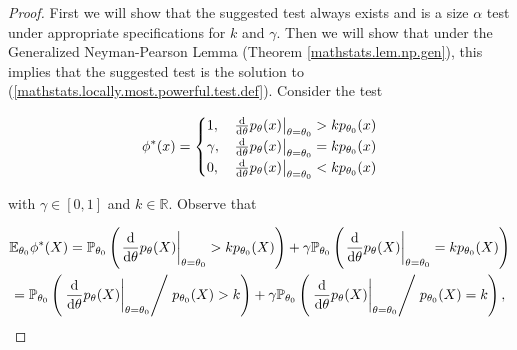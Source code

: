 \begin{proof}

First we will show that the suggested test always exists and is a size \(\alpha\) test under appropriate specifications for \(k\) and \(\gamma\). Then we will show that under the Generalized Neyman-Pearson Lemma (Theorem \ref{mathstats.lem.np.gen}), this implies that the suggested test is the solution to (\ref{mathstats.locally.most.powerful.test.def}). Consider the test

%



\begin{equation}\label{mathstats.541b.hw2.5.f}
\phi^*(x) = \begin{cases}
1, & \left. \deriv{}{\theta} p_\theta(x) \right|_{\theta = \theta_0} > k p_{\theta_0}(x)  \\
\gamma, & \left. \deriv{}{\theta} p_\theta(x) \right|_{\theta = \theta_0} = k p_{\theta_0}(x)  \\
0, & \left. \deriv{}{\theta} p_\theta(x) \right|_{\theta = \theta_0} < k p_{\theta_0}(x) 
\end{cases}
\end{equation}

with \(\gamma \in [0,1]\) and \(k \in \mathbb{R}\). Observe that 

\begin{multline}\label{mathstats.541b.hw2.5.e}
\E_{\theta_0} \phi^*(X) = \mathbb{P}_{\theta_0} \left( \left.  \deriv{}{\theta} p_\theta(X) \right|_{\theta = \theta_0} > k p_{\theta_0}(X) \right) + \gamma  \mathbb{P}_{\theta_0} \left( \left.  \deriv{}{\theta} p_\theta(X) \right|_{\theta = \theta_0} = k p_{\theta_0}(X) \right)
\\ = \mathbb{P}_{\theta_0} \left(  \left. \left.  \deriv{}{\theta} p_\theta(X) \right|_{\theta = \theta_0}  \middle/ \right.  p_{\theta_0}(X) > k \right) + \gamma  \mathbb{P}_{\theta_0} \left(  \left. \left.  \deriv{}{\theta} p_\theta(X) \right|_{\theta = \theta_0}  \middle/ \right.  p_{\theta_0}(X) = k \right),
\end{multline}


\end{proof}
